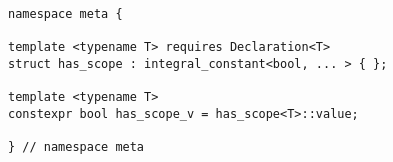 
\begin{verbatim}
namespace meta {

template <typename T> requires Declaration<T>
struct has_scope : integral_constant<bool, ... > { };

template <typename T>
constexpr bool has_scope_v = has_scope<T>::value;

} // namespace meta
\end{verbatim}

